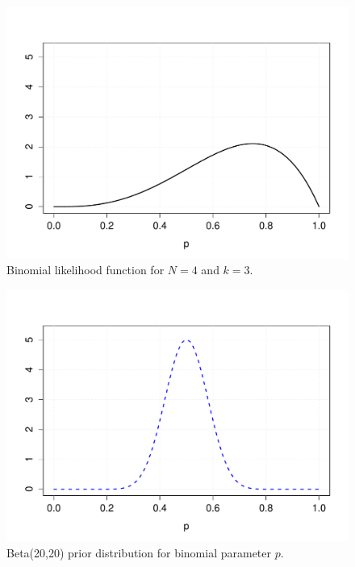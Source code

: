 \documentclass{beamer}
\begin{document}
\begin{frame}
    \begin{figure}
    \centering
        \includegraphics[width=.8\textwidth]{../images/binom_likelihood.pdf}
        \caption{Binomial likelihood function for $N=4$ and $k=3$.}
    \end{figure}
\end{frame}

\begin{frame}
    \begin{figure}
    \centering
        \includegraphics[width=.8\textwidth]{../images/binom_prior.pdf}
        \caption{Beta(20,20) prior distribution for binomial parameter $p$.}
    \end{figure}
\end{frame}
\end{document}
